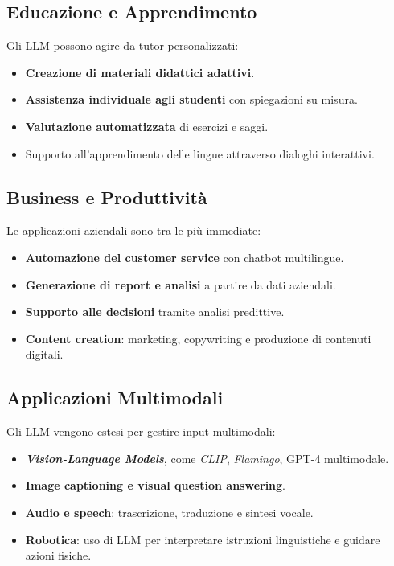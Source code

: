 \subsection{Educazione e Apprendimento}
Gli LLM possono agire da tutor personalizzati:
\begin{itemize}
    \item \textbf{Creazione di materiali didattici adattivi}.
    \item \textbf{Assistenza individuale agli studenti} con spiegazioni su misura.
    \item \textbf{Valutazione automatizzata} di esercizi e saggi.
    \item Supporto all'apprendimento delle lingue attraverso dialoghi interattivi.
\end{itemize}

\subsection{Business e Produttività}
Le applicazioni aziendali sono tra le più immediate:
\begin{itemize}
    \item \textbf{Automazione del customer service} con chatbot multilingue.
    \item \textbf{Generazione di report e analisi} a partire da dati aziendali.
    \item \textbf{Supporto alle decisioni} tramite analisi predittive.
    \item \textbf{Content creation}: marketing, copywriting e produzione di contenuti digitali.
\end{itemize}

\subsection{Applicazioni Multimodali}
Gli LLM vengono estesi per gestire input multimodali:
\begin{itemize}
    \item \textbf{\textit{Vision-Language Models}}, come \textit{CLIP}, \textit{Flamingo}, GPT-4 multimodale.
    \item \textbf{Image captioning e visual question answering}.
    \item \textbf{Audio e speech}: trascrizione, traduzione e sintesi vocale.
    \item \textbf{Robotica}: uso di LLM per interpretare istruzioni linguistiche e guidare azioni fisiche.
\end{itemize}

